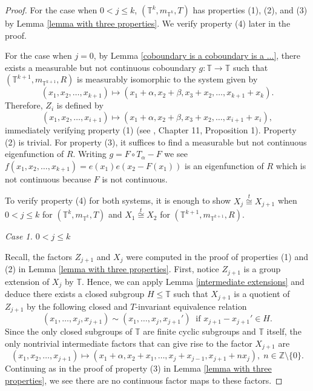 \documentclass[12pt]{amsart}
\theoremstyle{definition}
\theoremstyle{plain}
\theoremstyle{definition}
\numberwithin{equation}{section}
\begin{document}
\begin{proof}

For the case when $0<j\leq k$, $(\mathbb{T}^{k},m_{\mathbb{T}^{k}},T)$ has properties (1), (2), and (3) by Lemma \ref{lemma with three properties}. We verify property (4) later in the proof.

For the case when $j=0$, by Lemma \ref{coboundary is a coboundary is a ...}, there exists a measurable but not continuous coboundary $g\colon \mathbb{T} \rightarrow \mathbb{T}$ such that $(\mathbb{T}^{k+1},m_{\mathbb{T}^{k+1}},R)$ is measurably isomorphic to the system given by $$(x_1,x_2,\dots,x_{k+1})\mapsto (x_1+\alpha,x_2+\beta,x_3+x_2,\dots,x_{k+1}+x_k).$$ Therefore, $Z_i$ is defined by $$(x_1,x_2,\dots,x_{i+1})\mapsto (x_1+\alpha,x_2+\beta,x_3+x_2,\dots,x_{i+1}+x_i),$$ immediately verifying property (1) (see \cite{HK2}, Chapter 11, Proposition 1). Property (2) is trivial. For property (3), it suffices to find a measurable but not continuous eigenfunction of $R$. Writing $g=F\circ T_{\alpha}-F$ we see $f(x_1,x_2,\dots,x_{k+1})=e(x_1)e(x_2-F(x_1))$ is an eigenfunction of $R$ which is not continuous because $F$ is not continuous. 

To verify property (4) for both systems, it is enough to show $X_j \overset{t}\cong X_{j+1}$ when $0<j\leq k$ for $(\mathbb{T}^{k},m_{\mathbb{T}^{k}},T)$ and $X_1 \overset{t}\cong X_2$ for $(\mathbb{T}^{k+1},m_{\mathbb{T}^{k+1}},R)$.



\textit{Case 1. $0 <j \leq k$}

Recall, the factors $Z_{j+1}$ and $X_j$ were computed in the proof of properties (1) and (2) in Lemma \ref{lemma with three properties}. First, notice $Z_{j+1}$ is a group extension of $X_j$ by $\mathbb{T}$. Hence, we can apply
Lemma \ref{intermediate extensions} and deduce there exists a closed subgroup $H \leq \mathbb{T}$ such that $X_{j+1}$ is a quotient of $Z_{j+1}$ by the following closed and $T$-invariant equivalence relation
   $$(x_1,\dots,x_j,x_{j+1})\sim (x_1,\dots,x_j,x_{j+1}') \;\;\textrm{if $x_{j+1}-x_{j+1}'\in H$}.$$ Since the only closed subgroups of $\mathbb{T}$ are finite cyclic subgroups and $\mathbb{T}$ itself, the only nontrivial intermediate factors that can give rise to the factor $X_{j+1}$ are 
   $$(x_1,x_2,\dots, x_{j+1})\longmapsto (x_1+\alpha,x_2+x_1,\dots,x_{j}+x_{j-1},x_{j+1}+nx_j), \; n\in \mathbb{Z} \setminus \{0\}.$$ Continuing as in the proof of property (3) in Lemma \ref{lemma with three properties}, we see there are no continuous factor maps to these factors.
   

\end{proof}
\end{document}
